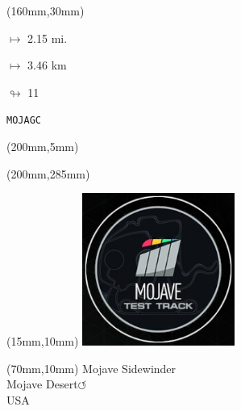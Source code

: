 \begin{textblock*}{40mm}(160mm,30mm)%
\Large
\par$\mapsto$ 2.15 mi.
\par$\mapsto$ 3.46 km
\par$\looparrowright$ 11
\par\hfill\tiny\tt MOJAGC\\
\end{textblock*}
\begin{textblock*}{20mm}(200mm,5mm)%
\fbox{\thepage}
\label{MOJAGC}
\end{textblock*}
\begin{textblock*}{20mm}(200mm,285mm)%
\fbox{\thepage}
\end{textblock*}

\null\newpage
\begin{textblock*}{50mm}(15mm,10mm)%
\includegraphics[width=50mm]{LG/MOJA.png}
\end{textblock*}
\begin{textblock*}{130mm}(70mm,10mm)%
{\fontsize{20}{20}\selectfont Mojave Sidewinder\\}
{\fontsize{16}{16}\selectfont Mojave Desert\hfill \huge$\circlearrowleft$\\}
{\fontsize{12}{12}\selectfont USA\\}
\end{textblock*}
